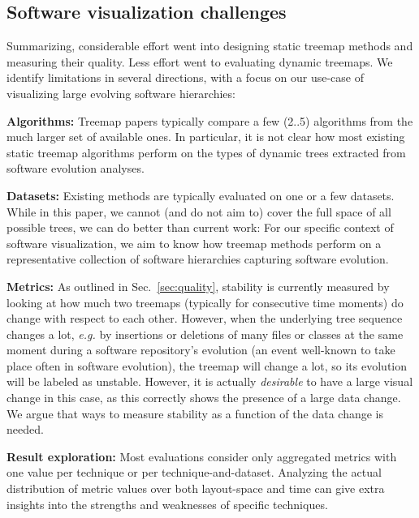 
\subsection{Software visualization challenges}
\label{sec:current_state}
%
%
Summarizing, considerable effort went into designing static treemap methods and measuring their quality. Less effort went to evaluating dynamic treemaps. We identify limitations in several directions, with a focus on our use-case of visualizing large evolving software hierarchies:

\noindent\textbf{Algorithms:} Treemap papers typically compare a few (2..5) algorithms from the much larger set of available ones. In particular, it is not clear how most existing static treemap algorithms perform on the types of dynamic trees extracted from software evolution analyses.

\noindent\textbf{Datasets:} Existing methods are typically evaluated on one or a few datasets. While in this paper, we cannot (and do not aim to) cover the full space of all possible trees, we can do better than current work: For our specific context of software visualization, we aim to know how treemap methods perform on a representative collection of software hierarchies capturing software evolution.

\noindent\textbf{Metrics:} As outlined in Sec.~\ref{sec:quality}, stability is currently measured by looking at how much two treemaps (typically for consecutive time moments) do change with respect to each other. However, when the underlying tree sequence changes a lot, \emph{e.g.} by insertions or deletions of many files or classes at the same moment during a software repository's evolution (an event well-known to take place often in software evolution), the treemap will change a lot, so its evolution will be labeled as unstable. However, it is actually \emph{desirable} to have a large visual change in this case, as this correctly shows the presence of a large data change. We argue that ways to measure stability as a function of the data change is needed.

\noindent\textbf{Result exploration:} Most evaluations consider only aggregated metrics with one value per technique or per technique-and-dataset. Analyzing the actual distribution of metric values over both layout-space and time can give extra insights into the strengths and weaknesses of specific techniques.

